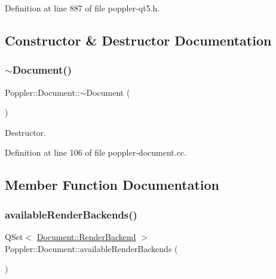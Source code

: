 Definition at line 887 of file poppler-\/qt5.\+h.



\subsection{Constructor \& Destructor Documentation}
\mbox{\label{class_poppler_1_1_document_ab0b992bb0e530f12ff665fba46418af2}} 
\subsubsection{\texorpdfstring{$\sim$\+Document()}{~Document()}}
{\footnotesize\ttfamily Poppler\+::\+Document\+::$\sim$\+Document (\begin{DoxyParamCaption}{ }\end{DoxyParamCaption})}

Destructor. 

Definition at line 106 of file poppler-\/document.\+cc.



\subsection{Member Function Documentation}
\mbox{\label{class_poppler_1_1_document_a3a664ff0948be89cd7ef2585f9e56659}} 
\subsubsection{\texorpdfstring{available\+Render\+Backends()}{availableRenderBackends()}}
{\footnotesize\ttfamily Q\+Set$<$ \hyperlink{class_poppler_1_1_document_a4b0a8ab6b6f686c8802a0ad112d48247}{Document\+::\+Render\+Backend} $>$ Poppler\+::\+Document\+::available\+Render\+Backends (\begin{DoxyParamCaption}{ }\end{DoxyParamCaption})\hspace{0.3cm}{\ttfamily [static]}}


